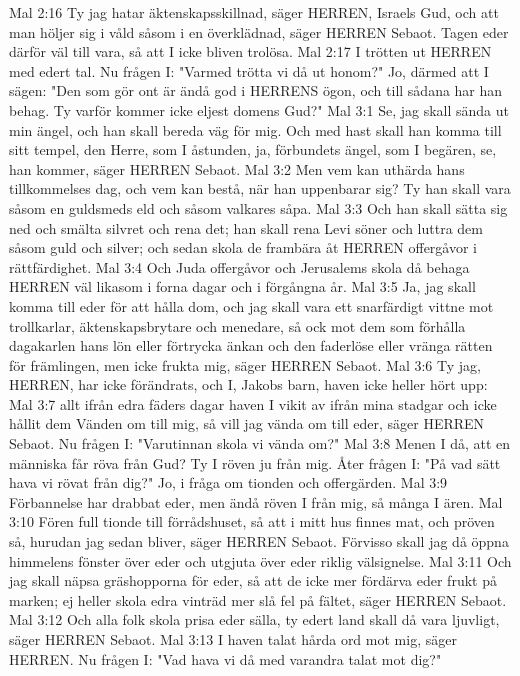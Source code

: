 Mal 2:16  Ty jag hatar äktenskapsskillnad, säger HERREN, Israels Gud, och att man höljer sig i våld såsom i en överklädnad, säger HERREN Sebaot. Tagen eder därför väl till vara, så att I icke bliven trolösa.
Mal 2:17  I trötten ut HERREN med edert tal. Nu frågen I: "Varmed trötta vi då ut honom?" Jo, därmed att I sägen: "Den som gör ont är ändå god i HERRENS ögon, och till sådana har han behag. Ty varför kommer icke eljest domens Gud?"
Mal 3:1  Se, jag skall sända ut min ängel, och han skall bereda väg för mig. Och med hast skall han komma till sitt tempel, den Herre, som I åstunden, ja, förbundets ängel, som I begären, se, han kommer, säger HERREN Sebaot.
Mal 3:2  Men vem kan uthärda hans tillkommelses dag, och vem kan bestå, när han uppenbarar sig? Ty han skall vara såsom en guldsmeds eld och såsom valkares såpa.
Mal 3:3  Och han skall sätta sig ned och smälta silvret och rena det; han skall rena Levi söner och luttra dem såsom guld och silver; och sedan skola de frambära åt HERREN offergåvor i rättfärdighet.
Mal 3:4  Och Juda offergåvor och Jerusalems skola då behaga HERREN väl likasom i forna dagar och i förgångna år.
Mal 3:5  Ja, jag skall komma till eder för att hålla dom, och jag skall vara ett snarfärdigt vittne mot trollkarlar, äktenskapsbrytare och menedare, så ock mot dem som förhålla dagakarlen hans lön eller förtrycka änkan och den faderlöse eller vränga rätten för främlingen, men icke frukta mig, säger HERREN Sebaot.
Mal 3:6  Ty jag, HERREN, har icke förändrats, och I, Jakobs barn, haven icke heller hört upp:
Mal 3:7  allt ifrån edra fäders dagar haven I vikit av ifrån mina stadgar och icke hållit dem Vänden om till mig, så vill jag vända om till eder, säger HERREN Sebaot. Nu frågen I: "Varutinnan skola vi vända om?"
Mal 3:8  Menen I då, att en människa får röva från Gud? Ty I röven ju från mig. Åter frågen I: "På vad sätt hava vi rövat från dig?" Jo, i fråga om tionden och offergärden.
Mal 3:9  Förbannelse har drabbat eder, men ändå röven I från mig, så många I ären.
Mal 3:10  Fören full tionde till förrådshuset, så att i mitt hus finnes mat, och pröven så, hurudan jag sedan bliver, säger HERREN Sebaot. Förvisso skall jag då öppna himmelens fönster över eder och utgjuta över eder riklig välsignelse.
Mal 3:11  Och jag skall näpsa gräshopporna för eder, så att de icke mer fördärva eder frukt på marken; ej heller skola edra vinträd mer slå fel på fältet, säger HERREN Sebaot.
Mal 3:12  Och alla folk skola prisa eder sälla, ty edert land skall då vara ljuvligt, säger HERREN Sebaot.
Mal 3:13  I haven talat hårda ord mot mig, säger HERREN. Nu frågen I: "Vad hava vi då med varandra talat mot dig?"
